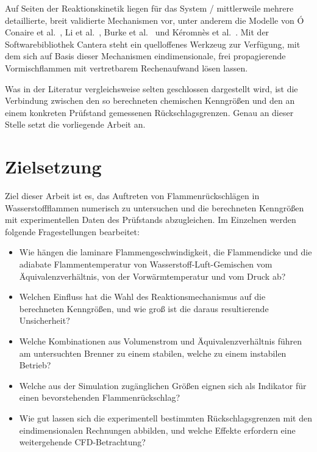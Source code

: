Auf Seiten der Reaktionskinetik liegen für das System /
mittlerweile mehrere detaillierte, breit validierte Mechanismen vor, unter
anderem die Modelle von Ó Conaire et al.\ \cite{OConaire_2004}, Li et al.\
\cite{Li_2004}, Burke et al.\ \cite{Burke_2012} und Kéromnès et al.\
\cite{Keromnes_2013}. Mit der Softwarebibliothek Cantera \cite{Cantera_2023}
steht ein quelloffenes Werkzeug zur Verfügung, mit dem sich auf Basis dieser
Mechanismen eindimensionale, frei propagierende Vormischflammen mit
vertretbarem Rechenaufwand lösen lassen.

Was in der Literatur vergleichsweise selten geschlossen dargestellt wird, ist
die Verbindung zwischen den so berechneten chemischen Kenngrößen und den an
einem konkreten Prüfstand gemessenen Rückschlagsgrenzen. Genau an dieser Stelle
setzt die vorliegende Arbeit an.

\section{Zielsetzung}\label{sec:zielsetzung}

Ziel dieser Arbeit ist es, das Auftreten von Flammenrückschlägen in
Wasserstoffflammen numerisch zu untersuchen und die berechneten Kenngrößen mit
experimentellen Daten des Prüfstands abzugleichen. Im Einzelnen werden folgende
Fragestellungen bearbeitet:

\begin{itemize}
	\item Wie hängen die laminare Flammengeschwindigkeit, die Flammendicke und
	      die adiabate Flammentemperatur von Wasserstoff-Luft-Gemischen vom
	      Äquivalenzverhältnis, von der Vorwärmtemperatur und vom Druck ab?
	\item Welchen Einfluss hat die Wahl des Reaktionsmechanismus auf die
	      berechneten Kenngrößen, und wie groß ist die daraus resultierende
	      Unsicherheit?
	\item Welche Kombinationen aus Volumenstrom und Äquivalenzverhältnis führen
	      am untersuchten Brenner zu einem stabilen, welche zu einem
	      instabilen Betrieb?
	\item Welche aus der Simulation zugänglichen Größen eignen sich als
	      Indikator für einen bevorstehenden Flammenrückschlag?
	\item Wie gut lassen sich die experimentell bestimmten Rückschlagsgrenzen
	      mit den eindimensionalen Rechnungen abbilden, und welche Effekte
	      erfordern eine weitergehende CFD-Betrachtung?
\end{itemize}

